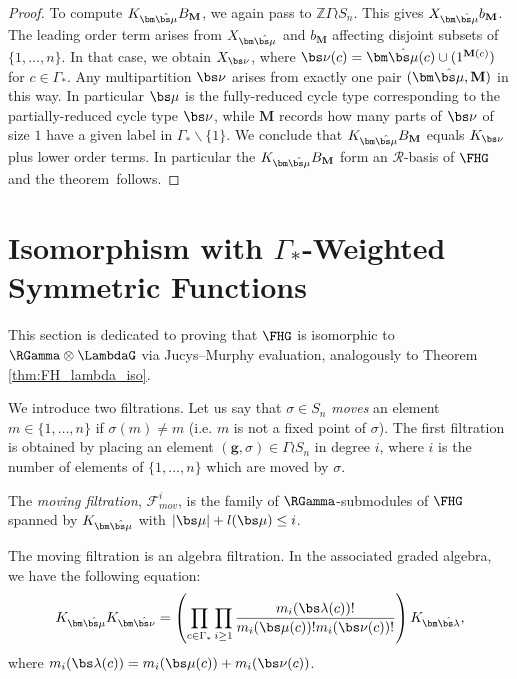 \begin{proof}
To compute $K_{\bm\hat{\bs\mu}}B_{\mathbf{M}}$, we again pass to $\mathbb{Z}\Gamma \wr S_n$. This gives $X_{\bm\hat{\bs\mu}}b_{\mathbf{M}}$. The leading order term arises from $X_{\bm\hat{\bs\mu}}$ and $b_{\mathbf{M}}$ affecting disjoint subsets of $\{1,\ldots, n\}$. In that case, we obtain $X_{\bs \nu}$, where $\bs \nu(c) = \bm \hat{\bs \mu}(c) \cup (1^{\mathbf{M}(c)})$ for $c \in \Gamma_*$. Any multipartition $\bs \nu$ arises from exactly one pair $(\bm\hat{\bs\mu}, \mathbf{M})$ in this way. In particular $\bs \mu$ is the fully-reduced cycle type corresponding to the partially-reduced cycle type $\bs \nu$, while $\mathbf{M}$ records how many parts of $\bs \nu$ of size $1$ have a given label in $\Gamma_*\backslash\{1\}$. We conclude that $K_{\bm\hat{\bs\mu}}B_{\mathbf{M}}$ equals $K_{\bs \nu}$ plus lower order terms. In particular the $K_{\bm\hat{\bs\mu}}B_{\mathbf{M}}$ form an $\mathcal{R}$-basis of $\FHG$ and the theorem~follows.
\end{proof}

\section{Isomorphism with \texorpdfstring{$\Gamma_*$}{Gamma*}-Weighted Symmetric Functions}\label{sec:6}

This section is dedicated to proving that $\FHG$ is isomorphic to $\RGamma \otimes \LambdaG$ via Jucys--Murphy evaluation, analogously to Theorem \ref{thm:FH_lambda_iso}.

We introduce two filtrations. Let us say that $\sigma \in S_n$ \emph{moves} an element $m \in \{1,\ldots, n\}$ if $\sigma(m) \neq m$ (i.e. $m$ is not a fixed point of $\sigma$). The first filtration is obtained by placing an element $(\mathbf{g}, \sigma) \in \Gamma \wr S_n$ in degree $i$, where $i$ is the number of elements of $\{1, \ldots, n\}$ which are moved by $\sigma$. 
\begin{definition}
The \emph{moving filtration}, $\mathcal{F}_{mov}^i$, is the family of $\RGamma$-submodules of $\FHG$ spanned by $K_{\bm\hat{\bs \mu}}$ with $|\bs \mu| + l(\bs \mu) \leq i$.
\end{definition}

\begin{proposition} \label{moving_filt_prop}
The moving filtration is an algebra filtration. In the associated graded algebra, we have the following equation:
\[
K_{\bm\hat{\bs \mu}}K_{\bm\hat{\bs \nu}} = \left( \prod_{c \in \Gamma_*} \prod_{i \geq 1} \frac{m_i(\bs\lambda(c))!}{m_i(\bs\mu(c))!m_i(\bs\nu(c))!}\right) K_{\bm\hat{\bs \lambda}},
\]
where $m_i(\bs\lambda(c)) = m_i(\bs\mu(c)) + m_i(\bs\nu(c))$.
\end{proposition}

